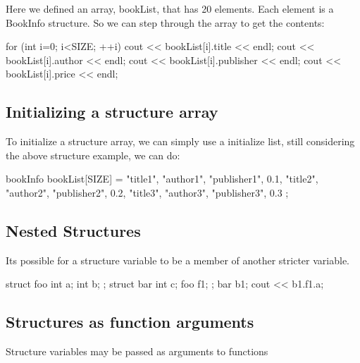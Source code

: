 \documentclass{report}
\begin{document}
	\bigbreak \noindent 
	Here we defined an array, bookList, that has 20 elements. Each element is a BookInfo structure.
	\bigbreak \noindent 
	So we can step through the array to get the contents:
	\bigbreak \noindent 
	
	\begin{cppcode}
for (int i=0; i<SIZE; ++i) {
        cout << bookList[i].title << endl;
        cout << bookList[i].author << endl;
        cout << bookList[i].publisher << endl;
        cout << bookList[i].price << endl;
    }
	\end{cppcode}
	
	\bigbreak \noindent 
	\subsection{Initializing a structure array}
	\bigbreak \noindent 
	To initialize a structure array, we can simply use a initialize list, still considering the above structure example, we can do:
	\bigbreak \noindent 
	
	\begin{cppcode}
bookInfo bookList[SIZE] = {
                            {"title1", "author1", "publisher1", 0.1},
                            {"title2", "author2", "publisher2", 0.2},
                            {"title3", "author3", "publisher3", 0.3}
                            };
	\end{cppcode}
	
	\bigbreak \noindent 

	\pagebreak \bigbreak \noindent 
	\subsection{Nested Structures}
	\bigbreak \noindent 
	Its possible for a structure variable to be a member of another stricter variable.
	\bigbreak \noindent 
	
	\begin{cppcode}
struct foo {
    int a;
    int b;
};
struct bar {
    int c;
    foo f1;
};
bar b1;
cout << b1.f1.a;
	\end{cppcode}
	

	\bigbreak \noindent 
	\subsection{Structures as function arguments}
	\bigbreak \noindent 
	\begin{concept}
	   Structure variables may be passed as arguments to functions 
	\end{concept}
	\bigbreak \noindent 
	
\end{document}
